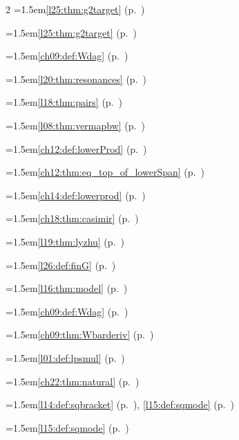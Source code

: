 \begin{multicols}{2}
\hangindent=1.5em\quad \ref{l25:thm:g2target} (p.~\pageref{l25:thm:g2target})\par
\hangindent=1.5em\quad \ref{l25:thm:g2target} (p.~\pageref{l25:thm:g2target})\par
\hangindent=1.5em\quad \ref{ch09:def:Wdag} (p.~\pageref{ch09:def:Wdag})\par
\hangindent=1.5em\quad \ref{l20:thm:resonances} (p.~\pageref{l20:thm:resonances})\par
\hangindent=1.5em\quad \ref{l18:thm:pairs} (p.~\pageref{l18:thm:pairs})\par
\hangindent=1.5em\quad \ref{l08:thm:vermapbw} (p.~\pageref{l08:thm:vermapbw})\par
\hangindent=1.5em\quad \ref{ch12:def:lowerProd} (p.~\pageref{ch12:def:lowerProd})\par
\hangindent=1.5em\quad \ref{ch12:thm:eq_top_of_lowerSpan} (p.~\pageref{ch12:thm:eq_top_of_lowerSpan})\par
\hangindent=1.5em\quad \ref{ch14:def:lowerprod} (p.~\pageref{ch14:def:lowerprod})\par
\hangindent=1.5em\quad \ref{ch18:thm:casimir} (p.~\pageref{ch18:thm:casimir})\par
\hangindent=1.5em\quad \ref{l19:thm:lyzhu} (p.~\pageref{l19:thm:lyzhu})\par
\hangindent=1.5em\quad \ref{l26:def:finG} (p.~\pageref{l26:def:finG})\par
\hangindent=1.5em\quad \ref{l16:thm:model} (p.~\pageref{l16:thm:model})\par
\hangindent=1.5em\quad \ref{ch09:def:Wdag} (p.~\pageref{ch09:def:Wdag})\par
\hangindent=1.5em\quad \ref{ch09:thm:Wbarderiv} (p.~\pageref{ch09:thm:Wbarderiv})\par
\hangindent=1.5em\quad \ref{l01:def:lpsmul} (p.~\pageref{l01:def:lpsmul})\par
\hangindent=1.5em\quad \ref{ch22:thm:natural} (p.~\pageref{ch22:thm:natural})\par
\hangindent=1.5em\quad \ref{l14:def:sqbracket} (p.~\pageref{l14:def:sqbracket}), \ref{l15:def:sqmode} (p.~\pageref{l15:def:sqmode})\par
\hangindent=1.5em\quad \ref{l15:def:sqmode} (p.~\pageref{l15:def:sqmode})\par

\end{multicols}
